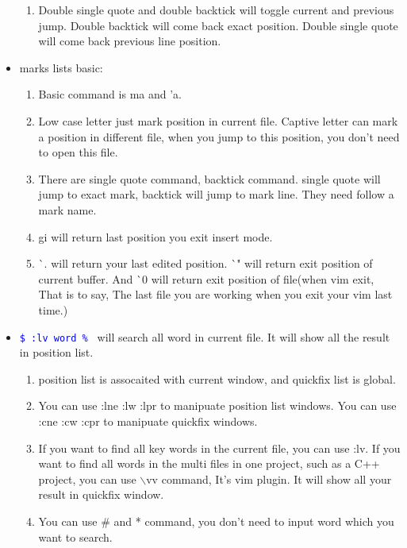 \documentclass[a4paper,12pt,twoside]{book}
\newcommand{\linuxcommand}[1]{\texttt{\textcolor{blue}{\$ #1 \Pisymbol{psy}{191}}}}
\begin{document}
\begin{itemize}
\begin{enumerate}
		\item Double single quote and double backtick will toggle current and previous jump. Double backtick will come back exact position. Double single quote will come back previous line position.  
\end{enumerate}

\item marks lists basic:
		\begin{enumerate}
		\item Basic command is ma and 'a. 

		\item Low case letter just mark position in current file. Captive letter can mark a position in different file, when you jump to this position, you don't need to open this file.

		\item There are single quote command, backtick command. single quote will jump to exact mark, backtick will jump to mark line. They need follow a mark name.

		\item gi will return last position you exit insert mode. 

		\item \`{}. will return your last edited position.  \`{}" will return exit position of current buffer. And \`{}0 will return exit position of file(when vim exit, That is to say, The last file you are working when you exit your vim last time.) 

		\end{enumerate}

\item \linuxcommand{:lv word \%} will search all word in current file. It will show all the result in position list. 
		\begin{enumerate}
				\item position list is assocaited with current window, and quickfix list is global.

				\item You can use :lne :lw :lpr to manipuate position list windows. You can use :cne :cw :cpr to manipuate quickfix windows. 

				\item If you want to find all key words in the current file, you can use :lv. If you want to find all words in the multi files in one project, such as a C++ project, you can use $\backslash$vv command, It's vim plugin. It will show all your result in quickfix window. 

				\item You can use \# and * command, you don't need to input word which you want to search. 


\end{enumerate}
\end{itemize}
\end{document}
